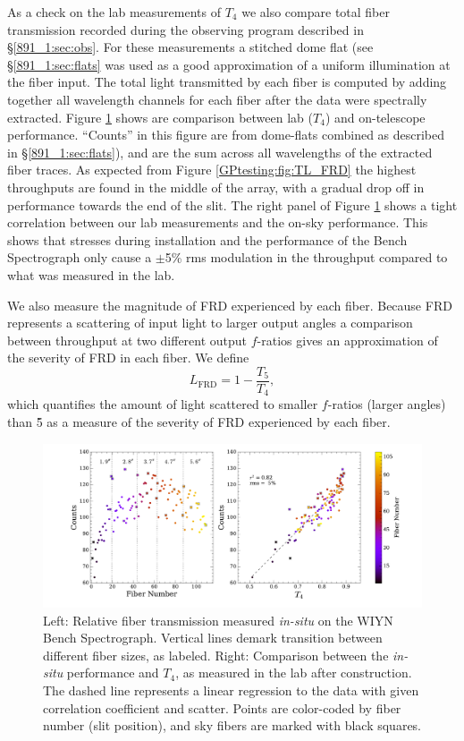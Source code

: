 As a check on the lab measurements of $T_4$ we also compare total
fiber transmission recorded during the observing program described in
\S\ref{891_1:sec:obs}. For these measurements a stitched dome flat (see
\S\ref{891_1:sec:flats} was used as a good approximation of a uniform
illumination at the fiber input. The total light transmitted by each
fiber is computed by adding together all wavelength channels for each
fiber after the data were spectrally extracted. Figure
\ref{GPtesting:fig:count_tput} shows are comparison between lab
($T_4$) and on-telescope performance. ``Counts'' in this figure are
from dome-flats combined as described in \S\ref{891_1:sec:flats}), and
are the sum across all wavelengths of the extracted fiber traces.  As
expected from Figure \ref{GPtesting:fig:TL_FRD} the highest
throughputs are found in the middle of the array, with a gradual drop
off in performance towards the end of the slit. The right panel of
Figure \ref{GPtesting:fig:count_tput} shows a tight correlation
between our lab measurements and the on-sky performance. This shows
that stresses during installation and the performance of the Bench
Spectrograph only cause a $\pm$5\% rms modulation in the throughput
compared to what was measured in the lab.

We also measure the magnitude of FRD experienced by each
fiber. Because FRD represents a scattering of input light to larger
output angles a comparison between throughput at two different output
$f$-ratios gives an approximation of the severity of FRD in each
fiber. We define
\begin{equation}
\label{GPtesting:eq:L_FRD}
  L_\mathrm{FRD} = 1 - \frac{T_5}{T_4},
\end{equation}
which quantifies the amount of light scattered to smaller $f$-ratios
(larger angles) than \f5 as a measure of the severity of FRD
experienced by each fiber.

\begin{figure}
  \centering
  \includegraphics[width=\textwidth]{Appendix/figs/gradpak_count_plots.pdf}
  \caption[\GP on-bench throughput
  performance]{\label{GPtesting:fig:count_tput}\fixspacing Left:
    Relative fiber
    transmission measured \emph{in-situ} on the WIYN Bench
    Spectrograph. Vertical lines demark transition between different
    fiber sizes, as labeled. Right: Comparison between the
    \emph{in-situ} performance and $T_4$, as measured in the lab after
    construction. The dashed line represents a linear regression to
    the data with given correlation coefficient and scatter. Points
    are color-coded by fiber number (slit position), and sky fibers
    are marked with black squares.}
\end{figure}

